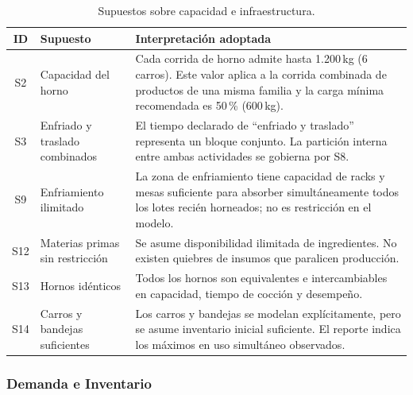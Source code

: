 \documentclass[10pt, a4paper]{article}
\begin{document}
\begin{table}[H]
\centering
\caption{Supuestos sobre capacidad e infraestructura.}
\label{tab:supuestos_capac}
\renewcommand{\arraystretch}{1.30}
\begin{tabularx}{\textwidth}{c >{\raggedright\arraybackslash}p{3.5cm} X}
\toprule
\rowcolor{azulClaro}
\textbf{ID} & \textbf{Supuesto} & \textbf{Interpretaci\'on adoptada} \\
\midrule
S2  & Capacidad del horno
    & Cada corrida de horno admite hasta 1.200\,kg (6 carros). Este valor
      aplica a la corrida combinada de productos de una misma familia y la
      carga m\'inima recomendada es 50\,\% (600\,kg). \\
\rowcolor{grisClaro}
S3  & Enfriado y traslado combinados
    & El tiempo declarado de ``enfriado y traslado'' representa un bloque
      conjunto. La partici\'on interna entre ambas actividades se gobierna
      por S8. \\
S9  & Enfriamiento ilimitado
    & La zona de enfriamiento tiene capacidad de racks y mesas suficiente
      para absorber simult\'aneamente todos los lotes reci\'en horneados; no
      es restricci\'on en el modelo. \\
\rowcolor{grisClaro}
S12 & Materias primas sin restricci\'on
    & Se asume disponibilidad ilimitada de ingredientes. No existen quiebres
      de insumos que paralicen producci\'on. \\
S13 & Hornos id\'enticos
    & Todos los hornos son equivalentes e intercambiables en capacidad,
      tiempo de cocci\'on y desempe\~no. \\
\rowcolor{grisClaro}
S14 & Carros y bandejas suficientes
    & Los carros y bandejas se modelan expl\'icitamente, pero se asume
      inventario inicial suficiente. El reporte indica los m\'aximos en uso
      simult\'aneo observados. \\
\bottomrule
\end{tabularx}
\end{table}

\subsubsection{Demanda e Inventario}
\end{document}
